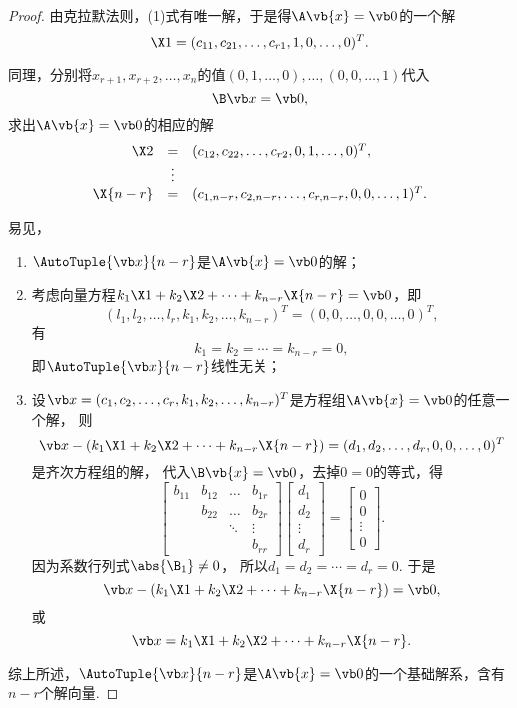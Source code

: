 \begin{theorem}
\begin{proof}
由克拉默法则，(1)式有唯一解，于是得\(\A\vb{x}=\vb0\)的一个解\[
\X1 = (c_{11},c_{21},\dotsc,c_{r1},1,0,\dotsc,0)^T.
\]

同理，分别将\(x_{r+1},x_{r+2},\dotsc,x_n\)的值\((0,1,\dotsc,0),\dotsc,(0,0,\dotsc,1)\)代入\[
	\B \x = \vb0,
\]
求出\(\A\vb{x}=\vb0\)的相应的解\[
	\begin{array}{rcl}
		\X2 &=& (c_{12},c_{22},\dotsc,c_{r2},0,1,\dotsc,0)^T, \\
		&\vdots& \\
		\X{n-r} &=& (c_{1,n-r},c_{2,n-r},\dotsc,c_{r,n-r},0,0,\dotsc,1)^T.
	\end{array}
\]

易见，\begin{enumerate}
	\item \(\AutoTuple{\x}{n-r}\)是\(\A\vb{x}=\vb0\)的解；

	\item 考虑向量方程\(k_1\X1+k_2\X2+\dotsb+k_{n-r}\X{n-r}=\vb0\)，即\[
		(l_1,l_2,\dotsc,l_r,k_1,k_2,\dotsc,k_{n-r})^T
		= (0,0,\dotsc,0,0,\dotsc,0)^T,
	\]
	有\[
		k_1 = k_2 = \dotsb = k_{n-r} = 0,
	\]
	即\(\AutoTuple{\x}{n-r}\)线性无关；

	\item 设\(\x=(c_1,c_2,\dotsc,c_r,k_1,k_2,\dotsc,k_{n-r})^T\)是方程组\(\A\vb{x}=\vb0\)的任意一个解，
	则\[
		\x - (k_1 \X1 + k_2 \X2 + \dotsb + k_{n-r} \X{n-r})
		= (d_1,d_2,\dotsc,d_r,0,0,\dotsc,0)^T
	\]是齐次方程组的解，
	代入\(\B\vb{x}=\vb0\)，去掉\(0 = 0\)的等式，得\[
		\begin{bmatrix}
			b_{11} & b_{12} & \dots & b_{1r} \\
			& b_{22} & \dots & b_{2r} \\
			& & \ddots & \vdots \\
			& & & b_{rr}
		\end{bmatrix}
		\begin{bmatrix}
			d_1 \\ d_2 \\ \vdots \\ d_r
		\end{bmatrix}
		= \begin{bmatrix}
			0 \\ 0 \\ \vdots \\ 0
		\end{bmatrix}.
	\]
	因为系数行列式\(\abs{\B_1} \neq 0\)，
	所以\(d_1 = d_2 = \dotsb = d_r = 0\).
	于是\[
		\x - (k_1 \X1 + k_2 \X2 + \dotsb + k_{n-r} \X{n-r}) = \vb0,
	\]或\[
		\x = k_1 \X1 + k_2 \X2 + \dotsb + k_{n-r} \X{n-r}.
	\]
\end{enumerate}

综上所述，\(\AutoTuple{\x}{n-r}\)是\(\A\vb{x}=\vb0\)的一个基础解系，含有\(n-r\)个解向量.
\end{proof}
\end{theorem}

